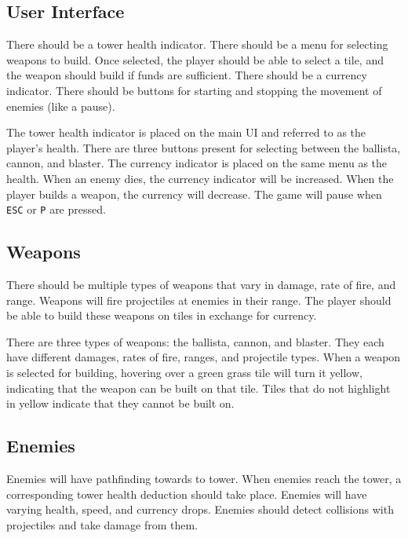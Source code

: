 \documentclass{article}
\begin{document}
\subsection{User Interface}

\begin{displayquote}
    \small
    There should be a tower health indicator. There should be a menu for selecting weapons to build. Once selected, the player should be able to select a tile, and the weapon should build if funds are sufficient. There should be a currency indicator. There should be buttons for starting and stopping the movement of enemies (like a pause).
\end{displayquote}

The tower health indicator is placed on the main UI and referred to as the player's health. There are three buttons present for selecting between the ballista, cannon, and blaster. The currency indicator is placed on the same menu as the health. When an enemy dies, the currency indicator will be increased. When the player builds a weapon, the currency will decrease. The game will pause when \lstinline{ESC} or \lstinline{P} are pressed.

\subsection{Weapons}

\begin{displayquote}
    \small
    There should be multiple types of weapons that vary in damage, rate of fire, and range. Weapons will fire projectiles at enemies in their range. The player should be able to build these weapons on tiles in exchange for currency.
\end{displayquote}

There are three types of weapons: the ballista, cannon, and blaster. They each have different damages, rates of fire, ranges, and projectile types. When a weapon is selected for building, hovering over a green grass tile will turn it yellow, indicating that the weapon can be built on that tile. Tiles that do not highlight in yellow indicate that they cannot be built on.

\subsection{Enemies}

\begin{displayquote}
    \small
    Enemies will have pathfinding towards to tower. When enemies reach the tower, a corresponding tower health deduction should take place. Enemies will have varying health, speed, and currency drops. Enemies should detect collisions with projectiles and take damage from them.
\end{displayquote}
\end{document}
